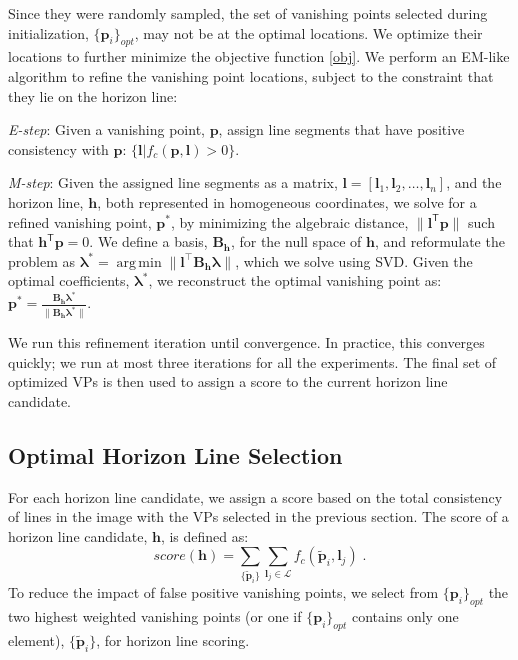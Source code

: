 Since they were randomly sampled, the set of vanishing points
selected during initialization, $\{\mathbf{p}_i\}_{opt}$, may not be at the
optimal locations.  We optimize their locations to further minimize
the objective function \eqref{obj}. We perform an EM-like algorithm
to refine the vanishing point locations, subject to the constraint
that they lie on the horizon line:
\begin{compactitem}

\item \emph{E-step}: Given a vanishing point, $\mathbf{p}$, assign
  line segments that have positive consistency with $\mathbf{p}$:
  $\{\mathbf{l}|f_c(\mathbf{p},\mathbf{l}) > 0\}$.
\item \emph{M-step}: Given the assigned line segments as a matrix,
  $\mathbf{l} = [\mathbf{l}_1, \mathbf{l}_2,\dots ,\mathbf{l}_n]$, and the horizon line,
  $\mathbf{h}$, both represented in homogeneous coordinates, we 
  solve for a refined vanishing point, $\mathbf{p}^*$, by minimizing the algebraic distance, $\|
  \mathbf{l}^\mathsf{T} \mathbf{p} \|$ such that $\mathbf{h}^\mathsf{T} \mathbf{p} = 0$. We define a
  basis, $\mathbf{B}_\mathbf{h}$, for the null space of $\mathbf{h}$, and reformulate
  the problem as $\mathbf{\lambda}^* = \operatorname*{arg\,min} \|
  \mathbf{l}^\top \mathbf{B}_\mathbf{h} \mathbf{\lambda} \|$, which we solve using SVD.
  Given the optimal coefficients, $\mathbf{\lambda}^*$, we reconstruct
  the optimal vanishing point as: $\mathbf{p}^* =
  \frac{\mathbf{B}_\mathbf{h}\mathbf{\lambda}^*}
  {\|\mathbf{B}_\mathbf{h}\mathbf{\lambda}^*\|}$.

\end{compactitem}

We run this refinement iteration until convergence. In practice, this
converges quickly; we run at most three iterations for all the
experiments. The final set of optimized VPs is then used to assign a
score to the current horizon line candidate.

\subsection{Optimal Horizon Line Selection}
\label{sec:horizonscoring}

For each horizon line candidate, we assign a score based on the total
consistency of lines in the image with the VPs selected in the
previous section.  The score of a horizon line candidate, $\mathbf{h}$, is
defined as:
\begin{equation}
  score(\mathbf{h}) = \sum_{\{\tilde{\mathbf{p}}_i\}} \sum_{\mathbf{l}_j \in
    \mathcal{L}}f_c(\tilde{\mathbf{p}}_i, \mathbf{l}_j) \; .
\end{equation}
To reduce the impact of false positive vanishing points, we select
from $\{\mathbf{p}_i\}_{opt}$ the two highest weighted vanishing points (or
one if $\{\mathbf{p}_i\}_{opt}$ contains only one element),
$\{\tilde{\mathbf{p}}_i\}$, for horizon line scoring.

